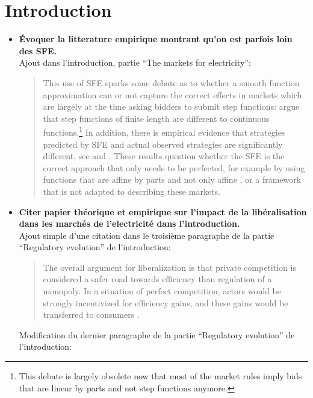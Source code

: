 \documentclass{article}
\begin{document}
\section{Introduction}
\begin{itemize}
\item\textbf{ Évoquer la litterature empirique montrant qu'on est parfois loin des SFE.}\\

Ajout dans l'introduction, partie ``The markets for electricity'':

\begin{quote}
This use of SFE sparks some debate as to whether a smooth function approximation can or not capture the correct effects in markets which are largely at the time asking bidders to submit step functions: \cite{von1993spot} argue that step functions of finite length are different to continuous functions.\footnote{This debate is largely obsolete now that most of the market rules imply bids that are linear by parts and not step functions anymore.} In addition, there is empirical evidence that strategies predicted by SFE and actual observed strategies are significantly different, see \cite{willems2009cournot} and \cite{willems2009cournot}. These results question whether the SFE is the correct approach that only needs to be perfected, for example by using functions that are affine by parts and not only affine \cite{baldick2004theory}, or a framework that is not adapted to describing these markets.
\end{quote}

\item \textbf{Citer papier théorique et empirique sur l'impact de la libéralisation dans les marchés de l'electricité dans l'introduction.}\\

Ajout simple d'une citation dans le troisième paragraphe de la partie ``Regulatory evolution'' de l'introduction:

\begin{quote}
The overall argument for liberalization is that private competition is considered a safer road towards efficiency than regulation of a monopoly. In a situation of perfect competition, actors would be strongly incentivized for efficiency gains, and these gains would be transferred to consumers \cite{schmidt1996costs}.
\end{quote}

Modification du dernier paragraphe de la partie ``Regulatory evolution'' de l'introduction:\\


\end{itemize}
\end{document}
